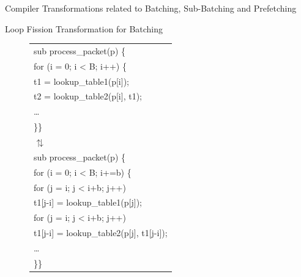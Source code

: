 \documentclass[final]{beamer}
\newlength{\sepwid}
\newlength{\onecolwid}
\newlength{\twocolwid}
\begin{document}
\begin{frame}
\begin{columns}[t]
\begin{column}{\twocolwid}
\begin{exampleblock}{Compiler Transformations related to Batching, Sub-Batching and Prefetching}
\begin{multicols}{3}
\begin{figure}[ht]
\begin{tiny}
\end{tiny}
\end{figure}
Loop Fission Transformation for Batching
\begin{figure}[ht]
\begin{tiny}
\begin{tabular}[b]{p{\onecolwid}}
sub{ process\_packet}(p) \{ \\
\hspace{0.2\sepwid}for (i = 0; i < B; i++) \{ \\
\hspace{0.4\sepwid}t1 = lookup\_table1(p[i]); \\
\hspace{0.4\sepwid}t2 = lookup\_table2(p[i], t1); \\
\hspace{0.4\sepwid}\ldots\\
\hspace{0.2\sepwid}\}\hspace{0.2\sepwid}\}\\
\vspace{1cm}
\hspace{1\sepwid}$\updownarrows$\\
\vspace{1cm}
sub {process\_packet}(p) \{\\
\hspace{0.2\sepwid}for (i = 0; i < B; i+=b) \{\\
\hspace{0.4\sepwid}for (j = i; j < i+b; j++)\\
\hspace{0.6\sepwid}t1[j-i] = lookup\_table1(p[j]);\\
\hspace{0.4\sepwid}for (j = i; j < i+b; j++)\\
\hspace{0.6\sepwid}t1[j-i] = lookup\_table2(p[j], t1[j-i]);\\
\hspace{0.4\sepwid}\ldots\\
\hspace{0.2\sepwid}\}\hspace{0.2\sepwid}\}
\end{tabular}
\end{tiny}
\end{figure}


\end{multicols}
\end{exampleblock}
\end{column}
\end{columns}
\end{frame}
\end{document}
